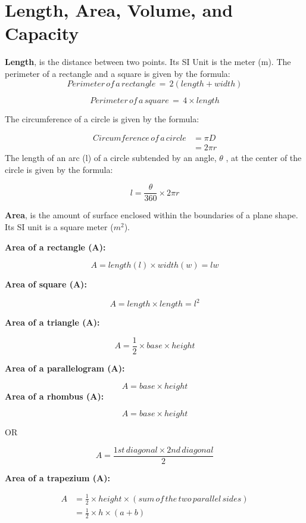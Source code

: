 \documentclass[
  letterpaper,
  DIV=11,
  numbers=noendperiod]{scrreprt}
\begin{document}

\hypertarget{length-area-volume-and-capacity}{%
\chapter*{Length, Area, Volume, and
Capacity}\label{length-area-volume-and-capacity}}


\textbf{Length}, is the distance between two points. Its SI Unit is the
meter (m). The perimeter of a rectangle and a square is given by the
formula: \[ Perimeter\, of \,a \,rectangle\,=\,2(length+width)\]

\[Perimeter \,of \,a \,square\,=\,4 \times length\]

The circumference of a circle is given by the formula:

\[
\begin{align*}
Circumference \,of\, a \,circle &=\pi D\\&=2\pi r
\end{align*} 
\] The length of an arc (l) of a circle subtended by an angle,
\(\theta\) , at the center of the circle is given by the formula:

\[ l=\frac{\theta}{360}\times 2\pi r\]

\textbf{Area}, is the amount of surface enclosed within the boundaries
of a plane shape. Its SI unit is a square meter (\(m^2\)).

\textbf{Area of a rectangle (A):}

\[A=length (l)\times width(w)=lw\]

\textbf{Area of square (A):}

\[A=length \times length= l^2\]

\textbf{Area of a triangle (A): }

\[A=\frac{1}{2} \times base \times height\]

\textbf{Area of a parallelogram (A):}

\[A=base \times height\] \textbf{Area of a rhombus (A):}

\[A=base \times height   \]

OR

\[A=\frac{1st\, diagonal \times 2nd \,diagonal}{2}\]

\textbf{Area of a trapezium  (A):}

\[
\begin{align*}
A&=\frac{1}{2} \times height\times (sum \,of \,the\, two \,parallel \,sides)\\
&=\frac{1}{2} \times h \times (a+b)
\end{align*}
\]
\end{document}
